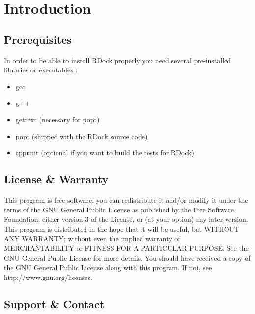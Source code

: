 \clearpage 
\section{Introduction}  \label{Introduction}
	\subsection{Prerequisites}  \label{Prerequisites}
	In order to be able to install RDock properly you need several pre-installed libraries or executables : 
	\begin{itemize}
		\item gcc
		\item g++
		\item gettext (necessary for popt)
		\item popt (shipped with the RDock source code)
		\item cppunit (optional if you want to build the tests for RDock)
	\end{itemize}
	
	\subsection{License \& Warranty}
	This program is free software: you can redistribute it and/or modify it under the terms of the GNU General Public License as published by the Free Software Foundation, either version 3 of the License, or (at your option) any later version.\newline
	This program is distributed in the hope that it will be useful,    but WITHOUT ANY WARRANTY; without even the implied warranty of    MERCHANTABILITY or FITNESS FOR A PARTICULAR PURPOSE.  See the     GNU General Public License for more details.\newline
    You should have received a copy of the GNU General Public License
    along with this program.  If not, see http://www.gnu.org/licenses.

	\subsection{Support \& Contact}
